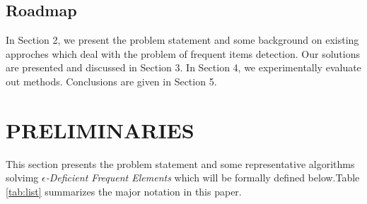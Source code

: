 \documentclass[conference]{IEEEtran}
\begin{document}
\subsection{Roadmap}
In Section 2, we present the problem statement and some background on existing approches which deal with the problem of frequent items detection. Our solutions are presented and discussed in Section 3. In Section 4, we experimentally evaluate out methods. Conclusions are given in Section 5.

\section{PRELIMINARIES}
This section presents the problem statement and some representative algorithms solvimg $\epsilon$\emph{-Deficient Frequent Elements} \cite{IEEEexample:sticky} which will be formally defined below.Table \ref{tab:list} summarizes the major notation in this paper.
\end{document}
